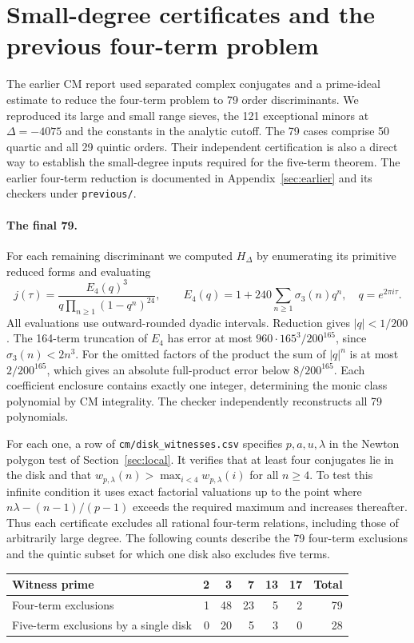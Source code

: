 \section{Small-degree certificates and the previous four-term problem}\label{sec:finite}
The earlier CM report used separated complex conjugates and a prime-ideal estimate to reduce the four-term problem to 79 order discriminants. We reproduced its large and small range sieves, the 121 exceptional minors at $\Delta=-4075$ and the constants in the analytic cutoff. The 79 cases comprise 50 quartic and all 29 quintic orders. Their independent certification is also a direct way to establish the small-degree inputs required for the five-term theorem. The earlier four-term reduction is documented in Appendix~\ref{sec:earlier} and its checkers under \texttt{previous/}.\cite{prior}
\paragraph{The final 79.}
For each remaining discriminant we computed $H_\Delta$ by enumerating its primitive reduced forms and evaluating
\[
 j(\tau)=\frac{E_4(q)^3}{q\prod_{n\ge1}(1-q^n)^{24}},\qquad
 E_4(q)=1+240\sum_{n\ge1}\sigma_3(n)q^n,\quad q=e^{2\pi i\tau}.
\]
All evaluations use outward-rounded dyadic intervals. Reduction gives $|q|<1/200$. The 164-term truncation of $E_4$ has error at most $960\cdot165^3/200^{165}$, since $\sigma_3(n)<2n^3$. For the omitted factors of the product the sum of $|q|^n$ is at most $2/200^{165}$, which gives an absolute full-product error below $8/200^{165}$. Each coefficient enclosure contains exactly one integer, determining the monic class polynomial by CM integrality. The checker independently reconstructs all 79 polynomials.

For each one, a row of \texttt{cm/disk\_witnesses.csv} specifies $p,a,u,\lambda$ in the Newton polygon test of Section~\ref{sec:local}. It verifies that at least four conjugates lie in the disk and that $w_{p,\lambda}(n)>\max_{i<4} w_{p,\lambda}(i)$ for all $n\ge4$. To test this infinite condition it uses exact factorial valuations up to the point where $n\lambda-(n-1)/(p-1)$ exceeds the required maximum and increases thereafter. Thus each certificate excludes all rational four-term relations, including those of arbitrarily large degree. The following counts describe the 79 four-term exclusions and the quintic subset for which one disk also excludes five terms.
\begin{center}
\begin{tabular}{lrrrrrr}
\toprule Witness prime&2&3&7&13&17&Total\\\midrule
Four-term exclusions&1&48&23&5&2&79\\
Five-term exclusions by a single disk&0&20&5&3&0&28\\\bottomrule
\end{tabular}
\end{center}

